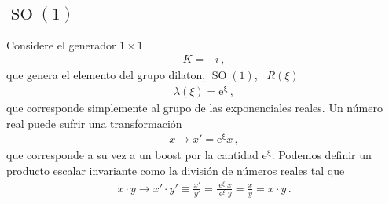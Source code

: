 \subsection{$\operatorname{SO}(1)$}
\begin{frame}
Considere el generador $1\times1$
\begin{align}
  K=-i\,,
\end{align}
que genera el elemento del grupo dilaton, $\operatorname{SO}(1)$,~\cite{Schwichtenberg:2019fjh} $R(\xi)$
\begin{align}
  \lambda(\xi)=\operatorname{e^{\xi}}\,,
\end{align}
que corresponde simplemente al grupo de las exponenciales reales. Un número real puede sufrir una transformación
\begin{align}
  x\to x'=\operatorname{e^{\xi}}x\,,
\end{align}
que corresponde a su vez a un boost por la cantidad $\operatorname{e^{\xi}}$. Podemos definir un producto escalar invariante como la división de números reales tal que
\begin{align}
  x\cdot y \to x'\cdot y'\equiv \frac{x'}{y'}= \frac{\operatorname{e}^{\xi}x}{\operatorname{e}^{\xi}y}=\frac{x}{y}=x\cdot y\,.
\end{align}
\end{frame}

